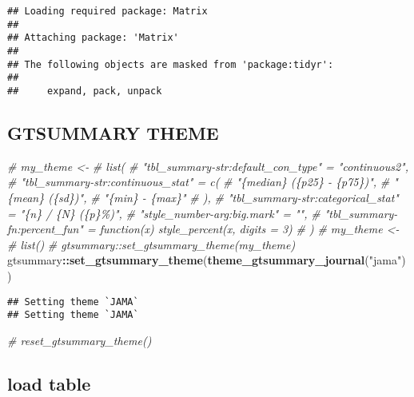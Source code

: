 \documentclass[
]{article}
\newenvironment{Shaded}{\begin{snugshade}}{\end{snugshade}}
\newcommand{\CommentTok}[1]{\textcolor[rgb]{0.56,0.35,0.01}{\textit{#1}}}
\newcommand{\FunctionTok}[1]{\textcolor[rgb]{0.13,0.29,0.53}{\textbf{#1}}}
\newcommand{\NormalTok}[1]{#1}
\newcommand{\SpecialCharTok}[1]{\textcolor[rgb]{0.81,0.36,0.00}{\textbf{#1}}}
\newcommand{\StringTok}[1]{\textcolor[rgb]{0.31,0.60,0.02}{#1}}
\begin{document}
\begin{verbatim}
## Loading required package: Matrix
## 
## Attaching package: 'Matrix'
## 
## The following objects are masked from 'package:tidyr':
## 
##     expand, pack, unpack
\end{verbatim}

\hypertarget{gtsummary-theme}{%
\subsection{GTSUMMARY THEME}\label{gtsummary-theme}}

\begin{Shaded}
\begin{Highlighting}[]
\CommentTok{\# my\_theme \textless{}{-}}
\CommentTok{\#   list(}
\CommentTok{\#     "tbl\_summary{-}str:default\_con\_type" = "continuous2",}
\CommentTok{\#     "tbl\_summary{-}str:continuous\_stat" = c(}
\CommentTok{\#       "\{median\} (\{p25\} {-} \{p75\})",}
\CommentTok{\#       "\{mean\} (\{sd\})",}
\CommentTok{\#       "\{min\} {-} \{max\}"}
\CommentTok{\#     ),}
\CommentTok{\#     "tbl\_summary{-}str:categorical\_stat" = "\{n\} / \{N\} (\{p\}\%)",}
\CommentTok{\#     "style\_number{-}arg:big.mark" = "",}
\CommentTok{\#     "tbl\_summary{-}fn:percent\_fun" = function(x) style\_percent(x, digits = 3)}
\CommentTok{\#   )}
\CommentTok{\# my\_theme \textless{}{-}}
\CommentTok{\#   list()}
\CommentTok{\# gtsummary::set\_gtsummary\_theme(my\_theme)}
\NormalTok{gtsummary}\SpecialCharTok{::}\FunctionTok{set\_gtsummary\_theme}\NormalTok{(}\FunctionTok{theme\_gtsummary\_journal}\NormalTok{(}\StringTok{"jama"}\NormalTok{))}
\end{Highlighting}
\end{Shaded}

\begin{verbatim}
## Setting theme `JAMA`
## Setting theme `JAMA`
\end{verbatim}

\begin{Shaded}
\begin{Highlighting}[]
\CommentTok{\# reset\_gtsummary\_theme()}
\end{Highlighting}
\end{Shaded}

\hypertarget{load-table}{%
\subsection{load table}\label{load-table}}
\end{document}

